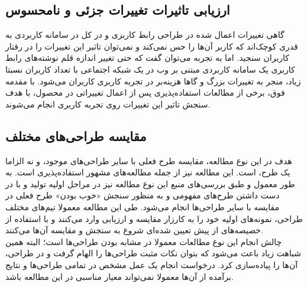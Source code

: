 \subsection{ارزیابی تاثیرات تغییرات جزئی و نامحسوس}
گاهی تغییرات اعمال شده در طراحی رابط  کاربری و در کل در سامانه کاربردی به قدری کوچک‌اند که کاربر آن‌ها را حس نمی‌کند و نمی‌توان تاثیر این تغییرات را در رفتار کاربران سنجید. اما به تجربه
\cite{albert_measuring_2013}
می‌توان گفت که حتی تغییر اندازه قلم نوشته‌های رابط کاربری یک سامانه کاربردی مبتنی بر وب در یک شبکه اجتماعی با تعداد کاربران نسبتا زیاد، منجر به تغییرات  بزرگ و گاها هزینه‌بر در تجربه کاربری کاربران می‌شود. با مقدمه فوق، برخی از مطالعات استفاده‌پذیری پس از اعمال تغییراتی در محصول، با هدف سنجش تاثیر این تغییرات روی تجربه کاربری انجام می‌شوند.
\subsection{مقایسه طراحی‌های مختلف}
هدف در این نوع مطالعه، مقایسه طرح فعلی با سایر طراحی‌های موجود، و نه الزاما یک طرح، است. این مطالعه نیز از جمله مطالعه‌های مشهور استفاده‌پذیری است. به طور معمول و طبق بررسی‌های منبع
\cite{albert_measuring_2013}
این نوع مطالعه نیز در مراحل اولیه تولید و با در دست داشتن طرح‌های مفهومی و به منظور سنجش «خوب بودن» طرح فعلی در مقایسه با سایر طراحی‌ها انجام می‌شود. طی این مطالعه معمولا تیم‌های مختلف طراحی، نمونه‌های اولیه
خود را به کارزار مقایسه و ارزیابی وارد می‌کنند و با استفاده از خصیصه‌های از پیش تعیین شده‌ای شروع به سنجش و مقایسه آن‌ها می‌کنند.\\
چالش انجام این نوع مطالعات معمولا در مشابه بودن طراحی‌ها است؛ البته همین شباهت زیاد باعث می‌شود که بتوان نکات مثبت طراحی‌ها را الهام گرفت و در طراحی، آن‌ها را پیاده‌سازی کرد. درخواست انجام یک عمل مشخص در تمامی طراحی‌ها و نتایج برآمده از آن‌ها معمولا نمی‌تواند معیار مناسبی در این مطالعه باشد.
